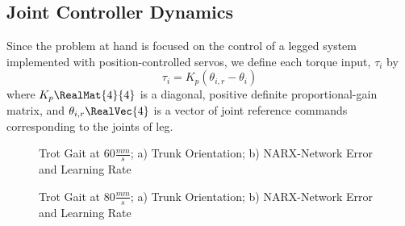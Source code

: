 
\subsection{Joint Controller Dynamics}
Since the problem at hand is focused on the control of a legged system implemented with 
position-controlled servos, we define each \ith torque input, $\tau_{i}$ by
\begin{equation}
\tau_{i} = K_{p} ( \theta_{i,r} - \theta_{i} ) 
\label{eq::servo_control_dynamics}
\end{equation}
where $K_{p} \RealMat{4}{4}$ is a diagonal, positive definite proportional-gain matrix,
and $\theta_{i,r} \RealVec{4}$ is a vector of joint reference commands corresponding to the joints of \ith leg.  

\begin{figure}[h!]
		\centering
		\caption{Trot Gait at 60$\frac{mm}{s}$; a) Trunk Orientation; b) NARX-Network Error and Learning Rate}
		\label{fig::results_1_1}
	\end{figure}
	\begin{figure}[h!]
		\centering
		\caption{Trot Gait at 80$\frac{mm}{s}$; a) Trunk Orientation; b) NARX-Network Error and Learning Rate}
		\label{fig::results_2_1}
	\end{figure}